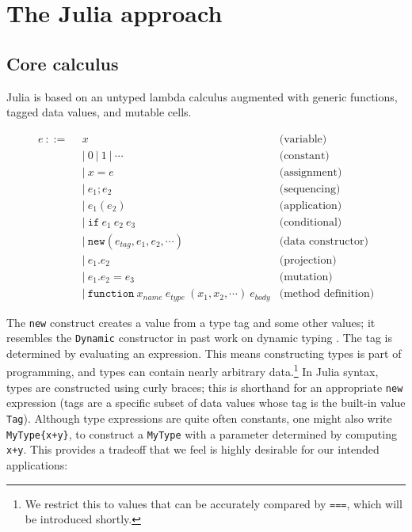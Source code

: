\chapter{The Julia approach}

\section{Core calculus}
\label{sec:corecalc}

Julia is based on an untyped lambda calculus augmented with generic functions,
tagged data values, and mutable cells.

\vspace{-3ex}
\begin{singlespace}
\begin{align*}
  e\ ::=\ &\ x                 & \textrm{(variable)} \\
        &\ |\ 0\ |\ 1\ |\ \cdots     & \textrm{(constant)} \\
        &\ |\ x = e          & \textrm{(assignment)} \\
        &\ |\ e_1; e_2       & \textrm{(sequencing)} \\
        &\ |\ e_1(e_2)       & \textrm{(application)} \\
        &\ |\ \texttt{if}\ e_1\ e_2\ e_3 & \textrm{(conditional)} \\
        &\ |\ \texttt{new}(e_{tag}, e_1, e_2, \cdots) & \textrm{(data constructor)} \\
        &\ |\ e_1.e_2        & \textrm{(projection)} \\
        &\ |\ e_1.e_2 = e_3  & \textrm{(mutation)} \\
        &\ |\ \texttt{function}\ x_{name}\ e_{type}\ (x_1, x_2, \cdots)\ e_{body} & \textrm{(method definition)}
\end{align*}
\end{singlespace}

The \texttt{new} construct creates a value from a type tag and some other
values; it resembles the \texttt{Dynamic} constructor
in past work on dynamic typing \cite{Abadi:1991:DTS:103135.103138}.
The tag is determined by evaluating an expression.
This means constructing types is part of programming, and types can
contain nearly arbitrary data.\footnote{We restrict this to values that can
be accurately compared by \texttt{===}, which will be introduced shortly.}
In Julia syntax, types are constructed using curly braces; this is shorthand
for an appropriate \texttt{new} expression
(tags are a specific subset of data values whose tag is the built-in value
\texttt{Tag}).
Although type expressions are quite often constants, one might also write
\texttt{MyType\{x+y\}}, to construct a \texttt{MyType} with
a parameter determined by computing \texttt{x+y}.
This provides a tradeoff that we feel is highly desirable for our intended
applications:

